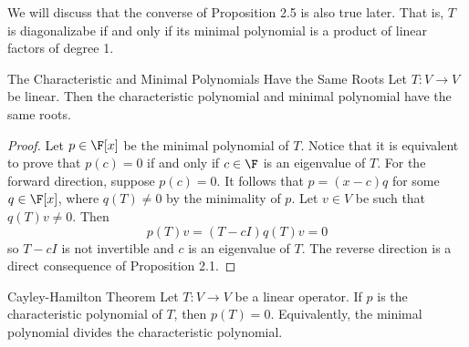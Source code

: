\documentclass[linearalgebraII]{subfiles}
\begin{document}
    \begin{remark}
        We will discuss that the converse of Proposition 2.5 is also true later. That is, $T$ is diagonalizabe if and only if its minimal polynomial is a product of linear factors of degree 1.
    \end{remark}

    \begin{prop}{The Characteristic and Minimal Polynomials Have the Same Roots}
        Let $T:V\to V$ be linear. Then the characteristic polynomial and minimal polynomial have the same roots.
    \end{prop}

    \begin{proof}
        Let $p\in\F[x]$ be the minimal polynomial of $T$. Notice that it is equivalent to prove that $p(c) = 0$ if and only if $c\in \F$ is an eigenvalue of $T$. For the forward direction, suppose $p(c) = 0$. It follows that $p = (x-c)q$ for some $q\in\F[x]$, where $q(T)\neq 0$ by the minimality of $p$. Let $v\in V$ be such that $q(T)v\neq 0$. Then
        \begin{equation*}
            p(T)v = (T-cI)q(T)v = 0
        \end{equation*}
        so $T-cI$ is not invertible and $c$ is an eigenvalue of $T$. The reverse direction is a direct consequence of Proposition 2.1.
    \end{proof}

    \begin{theorem}{Cayley-Hamilton Theorem}
        Let $T:V\to V$ be a linear operator. If $p$ is the characteristic polynomial of $T$, then $p(T) = 0$. Equivalently, the minimal polynomial divides the characteristic polynomial. 
    \end{theorem}
\end{document}
